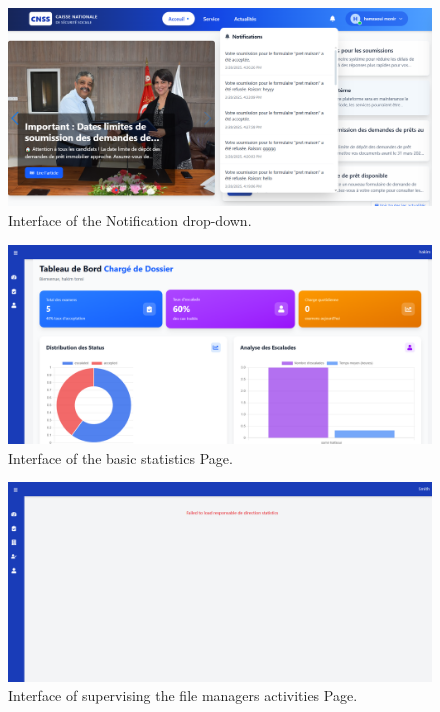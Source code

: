 \begin{figure}[h!]
    \centering
    \includegraphics[width=1\textwidth]{figures/ui-consult notif.png}
    \caption{Interface of the Notification drop-down.}
\end{figure}
\begin{figure}[h!]
    \centering
    \includegraphics[width=1\textwidth]{figures/ui-consult basic stat.png}
    \caption{Interface of the basic statistics Page.}
\end{figure}
\begin{figure}[h!]
    \centering
    \includegraphics[width=1\textwidth]{figures/ui-supervise assigned fl activities.png}
    \caption{Interface of supervising the file managers activities Page.}
\end{figure}

